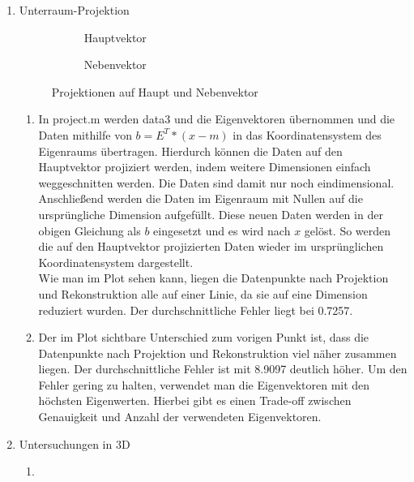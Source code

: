 \documentclass[]{report}
\newlength\figureheight
\newlength\figurewidth
\begin{document}
\begin{enumerate}
\begin{enumerate}
		\end{enumerate}
		\item Unterraum-Projektion
		
		\setlength\figureheight{3.5cm}
		\setlength{}
		\begin{figure}[tbp!]
			\begin{subfigure}{0.45\textwidth}
				\centering
				
				\caption{Hauptvektor}
				\label{fig:projection1}
			\end{subfigure}
			\qquad
			\begin{subfigure}{0.45\textwidth}
				\centering
				
				\caption{Nebenvektor}
				\label{fig:projection2}
			\end{subfigure}	
			\caption{Projektionen auf Haupt und Nebenvektor}
			\label{fig:projection}
		\end{figure}
		
		\begin{enumerate}
			\item
			In project.m werden data3 und die Eigenvektoren übernommen und die Daten mithilfe von $b=E^{T}*(x-m)$ in das Koordinatensystem des Eigenraums übertragen. Hierdurch können die Daten auf den Hauptvektor projiziert werden, indem weitere Dimensionen einfach weggeschnitten werden. Die Daten sind damit nur noch eindimensional.\\
			Anschließend werden die Daten im Eigenraum mit Nullen auf die ursprüngliche Dimension aufgefüllt. Diese neuen Daten werden in der obigen Gleichung als $b$ eingesetzt und es wird nach $x$ gelöst. So werden die auf den Hauptvektor projizierten Daten wieder im ursprünglichen Koordinatensystem dargestellt.\\
			Wie man im Plot sehen kann, liegen die Datenpunkte nach Projektion und Rekonstruktion alle auf einer Linie, da sie auf eine Dimension reduziert wurden. Der durchschnittliche Fehler liegt bei 0.7257.
			\item
			Der im Plot sichtbare Unterschied zum vorigen Punkt ist, dass die Datenpunkte nach Projektion und Rekonstruktion viel näher zusammen liegen. Der durchschnittliche Fehler ist mit 8.9097 deutlich höher. Um den Fehler gering zu halten, verwendet man die Eigenvektoren mit den höchsten Eigenwerten. Hierbei gibt es einen Trade-off zwischen Genauigkeit und Anzahl der verwendeten Eigenvektoren.
		\end{enumerate}
		
		\item Untersuchungen in 3D
		\begin{enumerate}
			\item
			

\end{enumerate}
\end{enumerate}
\end{document}
